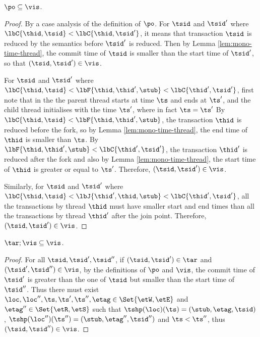 \begin{lem}[Session]
    \label{lem:session}
    \( \po \subseteq \vis \).
\end{lem}   
\begin{proof}
    By a case analysis of the definition of \( \po \).
    For \( \tsid \) and \( \tsid' \) where \( \lbC{\thid,\tsid} < \lbC{\thid,\tsid'} \), it means that transaction \( \tsid \) is reduced by the semantics before \( \tsid' \) is reduced.
    Then by Lemma \ref{lem:mono-time-thread}, the commit time of \( \tsid \) is smaller than the start time of \( \tsid' \), so that \( (\tsid, \tsid') \in \vis \).

    For \( \tsid \) and \( \tsid' \) where \( \lbC{\thid,\tsid} < \lbF{\thid,\thid', \stub} < \lbC{\thid',\tsid'} \), first note that in the  the parent thread starts at time \( \ts \) and ends at \( \ts' \), and the child thread initialises with the time \( \ts' \), where  in fact \( \ts = \ts' \)
    By \( \lbC{\thid,\tsid} < \lbF{\thid,\thid', \stub}  \), the transaction \( \thid \) is reduced before the fork, so by Lemma \ref{lem:mono-time-thread}, the end time of \( \thid \) is smaller than \( \ts \).
    By \( \lbF{\thid,\thid', \stub} < \lbC{\thid',\tsid'} \), the transaction \( \thid' \) is reduced after the fork and also by Lemma \ref{lem:mono-time-thread}, the start time of \( \thid \) is greater or equal to \( \ts' \).
    Therefore, \( (\tsid, \tsid') \in \vis \).

    Similarly, for \( \tsid \) and \( \tsid' \) where \( \lbC{\thid,\tsid} < \lbJ{\thid',\thid, \stub} < \lbC{\thid',\tsid'} \), all the transactions by thread \( \thid \) must have smaller start and end times than all the transactions by thread \( \thid' \) after the join point.
    Therefore, \( (\tsid, \tsid') \in \vis \).
\end{proof}


\begin{lem}
    \label{lem:semi-prefix}
    \( \tar; \vis \subseteq \vis \).
\end{lem}
\begin{proof}
    For all \( \tsid, \tsid', \tsid'' \), if \( (\tsid, \tsid') \in \tar \) and \( (\tsid', \tsid'') \in \vis \), by the definitions of \( \po \) and \( \vis \), the commit time of \( \tsid' \) is greater than the one of \( \tsid \) but smaller than the start time of \( \tsid'' \).
    Thus there must exist \( \loc, \loc'', \ts, \ts' , \ts'', \etag \in \Set{\etW, \etE}  \) and \( \etag'' \in \Set{\etR, \etS } \) such that  \( \tshp(\loc)(\ts) = (\stub, \etag, \tsid) \), \( \tshp(\loc'')(\ts'') = (\stub, \etag'', \tsid'') \) and \( \ts < \ts'' \), thus \( ( \tsid, \tsid'' ) \in \vis \).
\end{proof}

